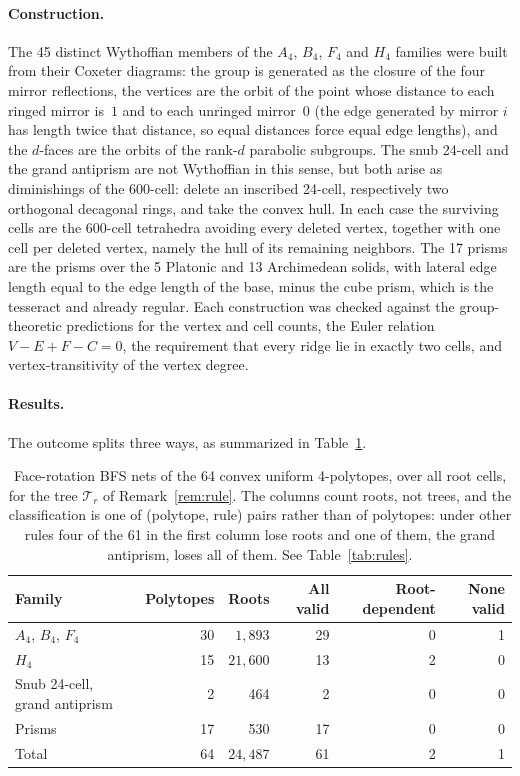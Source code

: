 \documentclass[11pt,letterpaper]{article}
\begin{document}
\paragraph{Construction.}
The 45 distinct Wythoffian members of the $A_4$, $B_4$, $F_4$ and
$H_4$ families were built from their Coxeter diagrams: the group is
generated as the closure of the four mirror reflections, the vertices
are the orbit of the point whose distance to each ringed mirror
is~$1$ and to each unringed mirror~$0$ (the edge generated by mirror
$i$ has length twice that distance, so equal distances force equal
edge lengths), and the $d$-faces are the orbits of the rank-$d$
parabolic subgroups.
The snub 24-cell and the grand antiprism are not Wythoffian in this
sense, but both arise as diminishings of the 600-cell: delete an
inscribed 24-cell, respectively two orthogonal decagonal rings, and
take the convex hull.
In each case the surviving cells are the 600-cell tetrahedra avoiding
every deleted vertex, together with one cell per deleted vertex,
namely the hull of its remaining neighbors.
The 17 prisms are the prisms over the 5 Platonic and 13 Archimedean
solids, with lateral edge length equal to the edge length of the base,
minus the cube prism, which is the tesseract and already regular.
Each construction was checked against the group-theoretic predictions
for the vertex and cell counts, the Euler relation
$V-E+F-C=0$, the requirement that every ridge lie in exactly two
cells, and vertex-transitivity of the vertex degree.

\paragraph{Results.}
The outcome splits three ways, as summarized in
Table~\ref{tab:uniform}.

\begin{table}[ht]
\centering
\caption{Face-rotation BFS nets of the 64 convex uniform 4-polytopes,
  over all root cells, for the tree $\mathcal{T}_r$ of
  Remark~\ref{rem:rule}.
  The columns count roots, not trees, and the classification is one of
  (polytope, rule) pairs rather than of polytopes: under other rules
  four of the 61 in the first column lose roots and one of them, the
  grand antiprism, loses all of them.
  See Table~\ref{tab:rules}.}
\label{tab:uniform}
\begin{tabular}{lrrrrr}
\toprule
Family & Polytopes & Roots & All valid & Root-dependent & None valid\\
\midrule
$A_4$, $B_4$, $F_4$   & 30 & $1{,}893$  & 29 & 0 & 1\\
$H_4$                 & 15 & $21{,}600$ & 13 & 2 & 0\\
Snub 24-cell, grand antiprism & 2 & 464 & 2 & 0 & 0\\
Prisms                & 17 & 530        & 17 & 0 & 0\\
\midrule
Total                 & 64 & $24{,}487$ & 61 & 2 & 1\\
\bottomrule
\end{tabular}
\end{table}
\end{document}
